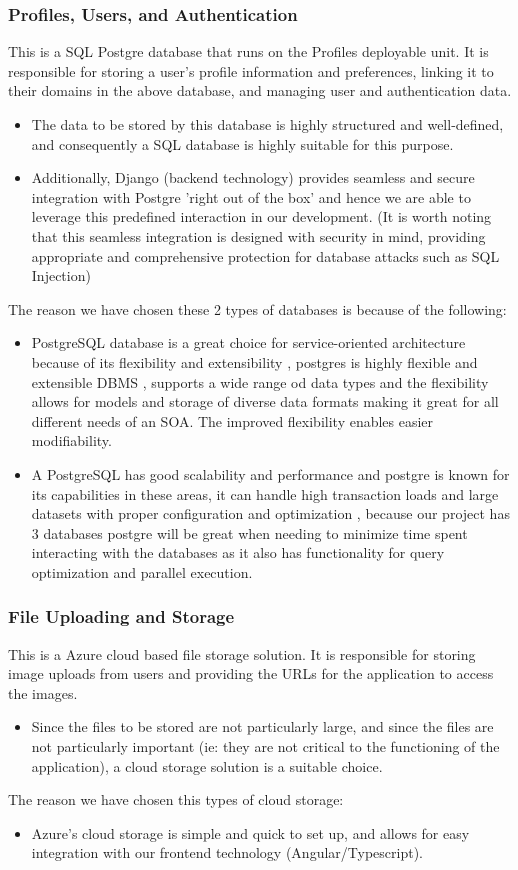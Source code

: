 \documentclass[12pt]{article}
\begin{document}
\subsubsection{Profiles, Users, and Authentication}
This is a SQL Postgre database that runs on the Profiles deployable unit. It is responsible for storing a user's profile information and preferences, linking it to their domains in the above database, and managing user and authentication data.
\begin{itemize}
    \item The data to be stored by this database is highly structured and well-defined, and consequently a SQL database is highly suitable for this purpose.
    \item Additionally, Django (backend technology) provides seamless and secure integration with Postgre 'right out of the box' and hence we are able to leverage this predefined interaction in our development. (It is worth noting that this seamless integration is designed with security in mind, providing appropriate and comprehensive protection for database attacks such as SQL Injection)
\end{itemize}
The reason we have chosen these 2 types of databases is because of the following:
\begin{itemize}
    \item PostgreSQL database is a great choice for service-oriented architecture because of its flexibility and extensibility , postgres is highly flexible and extensible DBMS , supports a wide range od data types and the flexibility allows for models and storage of diverse data formats making it great for all different needs of an SOA. The improved flexibility enables easier modifiability.
    \item A PostgreSQL has good scalability and performance and postgre is known for its capabilities in these areas, it can handle high transaction loads and large datasets with proper configuration and optimization , because our project has 3 databases postgre will be great when needing to minimize time spent interacting with the databases as it also has functionality for query optimization and parallel execution.
\end{itemize}
\subsubsection{File Uploading and Storage}
This is a Azure cloud based file storage solution. It is responsible for storing image uploads from users and providing the URLs for the application to access the images.
\begin{itemize}
    \item Since the files to be stored are not particularly large, and since the files are not particularly important (ie: they are not critical to the functioning of the application), a cloud storage solution is a suitable choice.
\end{itemize}
The reason we have chosen this types of cloud storage:
\begin{itemize}
    \item Azure's cloud storage is simple and quick to set up, and allows for easy integration with our frontend technology (Angular/Typescript).
\end{itemize}
\end{document}
